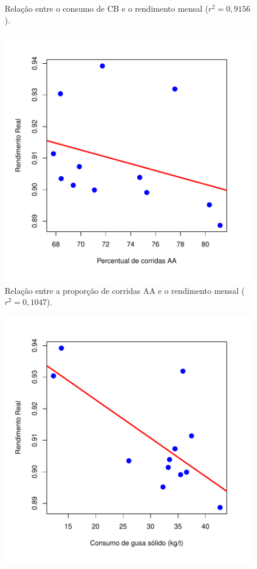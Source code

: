 \begin{multicols}{2}
\begin{figure}[H]
		\caption{Relação entre o consumo de CB e o rendimento mensal ($r^2=0,9156$).}
		\label{fig:cb}
	\end{figure}	
	\begin{figure}[H]
		\centering
		\includegraphics[scale=0.4, bb=0 0 432 432, trim=0in 0in 0in 0in]{figures/fig06.pdf} %
		\caption{Relação entre a proporção de corridas AA e o rendimento mensal ($r^2=0,1047$).}
		\label{fig:aa}
	\end{figure}			
	\begin{figure}[H]
		\centering
		\includegraphics[scale=0.4, bb=0 0 432 432, trim=0in 0in 0in 0in]{figures/fig07.pdf} %

\end{figure}
\end{multicols}
